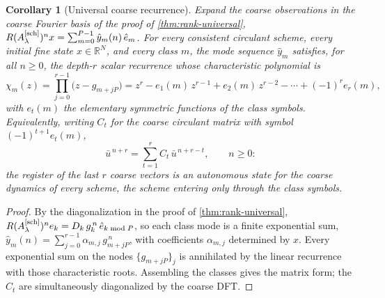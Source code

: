 \documentclass[pdflatex,sn-mathphys-num]{sn-jnl}%
\theoremstyle{thmstyleone}%
\newtheorem{corollary}{Corollary}%
\theoremstyle{thmstyletwo}%
\theoremstyle{thmstylethree}%
\newcommand{\R}{\mathbb R}
\newcommand{\Asch}{A^{[\rm sch]}_\lambda}
\begin{document}
\begin{corollary}[Universal coarse recurrence]\label{cor:coarse-recurrence}
Expand the coarse observations in the coarse Fourier basis of the proof of \cref{thm:rank-universal}, $R(\Asch)^nx=\sum_{m=0}^{P-1}\hat y_m(n)\,\hat e_m$.
For every consistent circulant scheme, every initial fine state $x\in\R^N$, and every class $m$, the mode sequence $\hat y_m$ satisfies, for all $n\ge0$, the depth-$r$ scalar recurrence whose characteristic polynomial is \[ \chi_m(z)=\prod_{j=0}^{r-1}\bigl(z-g_{m+jP}\bigr) =z^{r}-e_1(m)\,z^{r-1}+e_2(m)\,z^{r-2}-\cdots+(-1)^{r}e_r(m), \] with $e_t(m)$ the elementary symmetric functions of the class symbols.
Equivalently, writing $C_t$ for the coarse circulant matrix with symbol $(-1)^{t+1}e_t(m)$, \[ \bar u^{\,n+r}=\sum_{t=1}^{r}C_t\,\bar u^{\,n+r-t}, \qquad n\ge0: \] the register of the last $r$ coarse vectors is an autonomous state for the coarse dynamics of every scheme, the scheme entering only through the class symbols.
\end{corollary}

\begin{proof}
By the diagonalization in the proof of \cref{thm:rank-universal}, $R(\Asch)^ne_k=D_k\,g_k^{\,n}\,\hat e_{k\bmod P}$, so each class mode is a finite exponential sum, $\hat y_m(n)=\sum_{j=0}^{r-1}\alpha_{m,j}\,g_{m+jP}^{\,n}$, with coefficients $\alpha_{m,j}$ determined by $x$.
Every exponential sum on the nodes $\{g_{m+jP}\}_j$ is annihilated by the linear recurrence with those characteristic roots.
Assembling the classes gives the matrix form; the $C_t$ are simultaneously diagonalized by the coarse DFT.
\end{proof}
\end{document}
